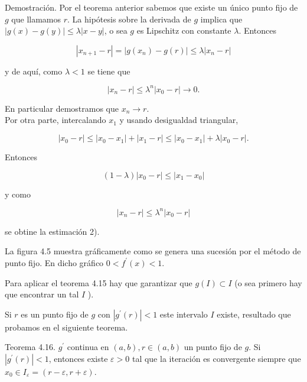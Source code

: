 \documentclass[10pt]{article}
\begin{document}
Demostración. Por el teorema anterior sabemos que existe un único punto fijo de $g$ que llamamos $r$. La hipótesis sobre la derivada de $g$ implica que $|g(x)-g(y)| \leq \lambda|x-y|$, o sea $g$ es Lipschitz con constante $\lambda$. Entonces

$$
\left|x_{n+1}-r\right|=\left|g\left(x_{n}\right)-g(r)\right| \leq \lambda\left|x_{n}-r\right|
$$

y de aquí, como $\lambda<1$ se tiene que

$$
\left|x_{n}-r\right| \leq \lambda^{n}\left|x_{0}-r\right| \rightarrow 0 .
$$

En particular demostramos que $x_{n} \rightarrow r$.\\
Por otra parte, intercalando $x_{1}$ y usando desigualdad triangular,

$$
\left|x_{0}-r\right| \leq\left|x_{0}-x_{1}\right|+\left|x_{1}-r\right| \leq\left|x_{0}-x_{1}\right|+\lambda\left|x_{0}-r\right| .
$$

Entonces

$$
(1-\lambda)\left|x_{0}-r\right| \leq\left|x_{1}-x_{0}\right|
$$

y como

$$
\left|x_{n}-r\right| \leq \lambda^{n}\left|x_{0}-r\right|
$$

se obtine la estimación 2).

La figura 4.5 muestra gráficamente como se genera una sucesión por el método de punto fijo. En dicho gráfico $0<f^{\prime}(x)<1$.

Para aplicar el teorema 4.15 hay que garantizar que $g(I) \subset I$ (o sea primero hay que encontrar un tal $I$ ).

Si $r$ es un punto fijo de $g$ con $\left|g^{\prime}(r)\right|<1$ este intervalo $I$ existe, resultado que probamos en el siguiente teorema.

Teorema 4.16. $g^{\prime}$ continua en $(a, b), r \in(a, b)$ un punto fijo de $g$. Si $\left|g^{\prime}(r)\right|<1$, entonces existe $\varepsilon>0$ tal que la iteración es convergente siempre que $x_{0} \in I_{\varepsilon}=(r-\varepsilon, r+\varepsilon)$.
\end{document}
